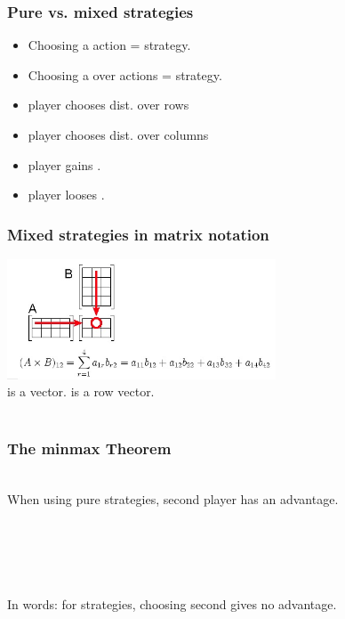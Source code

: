 \documentclass{beamer}
\begin{document}
\begin{frame}
\frametitle{Pure vs. mixed strategies}
\begin{itemize}
\item Choosing a  action =  strategy.
\item Choosing a  over actions =  strategy.
\item {} player chooses dist. over rows \R{$\P$}
\item {} player chooses dist. over columns \R{$\Q$}
\item {} player gains \R{$\M(\P,\Q)$}.
\item {} player looses \R{$\M(\P,\Q)$}.
\end{itemize}
\end{frame}

\begin{frame}
\frametitle{Mixed strategies in matrix notation}
\includegraphics[width=8cm]{figures/matrixProduct.jpg}
\pause \\
\R{$\Q$} is a  vector.  is a row vector.
\pause \\ ~\\
\end{frame}

\begin{frame}
  \frametitle{The minmax Theorem}
~\\
When using pure strategies, second player has an advantage.
~\\~\\ ~\pause
{}
\\ ~ \\ 
\R{\[ \minp \maxq \mpq = \maxq \minp \mpq \]}
\\ ~ \\ 
In words: for  strategies, choosing second gives no advantage.
\end{frame}
\end{document}
